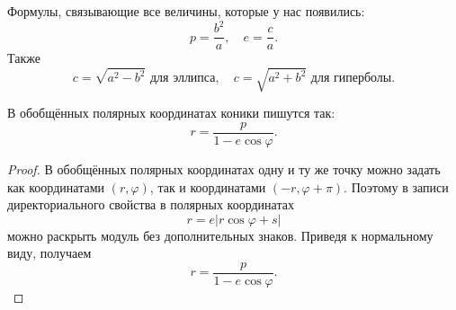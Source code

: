 Формулы, связывающие все величины, которые у нас появились:
$$
p = \frac{b^2}{a},\quad e = \frac{c}{a}.
$$
Также
$$
c = \sqrt{a^2 - b^2}\text{ для эллипса},\quad c = \sqrt{a^2 + b^2}\text{ для гиперболы}.
$$

\begin{theorem}
    В обобщённых полярных координатах коники пишутся так:
    $$
    r = \frac{p}{1 - e\cos\varphi}.
    $$
\end{theorem}

\begin{proof}
    В обобщённых полярных координатах одну и ту же точку можно задать как координатами $(r, \varphi)$, так и координатами $(-r, \varphi + \pi)$. Поэтому в записи директориального свойства в полярных координатах
    $$
    r = e|r\cos\varphi + s|
    $$
    можно раскрыть модуль без дополнительных знаков. Приведя к нормальному виду, получаем
    $$
    r = \frac{p}{1 - e\cos\varphi}.
    $$
\end{proof}


